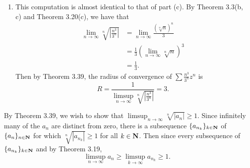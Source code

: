 \begin{ex}
\begin{enumerate}
\item This computation is almost identical to that of part (c). By Theorem 3.3(b, c) and Theorem 3.20(c), we have that
\begin{align*}
\lim_{n\to\infty}\sqrt[n]{\left|\frac{n^3}{3^n}\right|} & = \lim_{n\to\infty}\frac{(\sqrt[n]{n})^n}{3}\\
& = \frac{1}{3}\left(\lim_{n\to\infty}\sqrt[n]{n}\right)^3\\
& = \frac{1}{3}.
\end{align*}
Then by Theorem 3.39, the radius of convergence of $\sum\frac{n^3}{3^n}z^n$ is \[R = \frac{1}{\limsup_{n\to\infty}\sqrt[n]{\left|\frac{n^3}{3^n}\right|}} = 3.\]
\end{enumerate}
\end{ex}

\begin{ex}
By Theorem 3.39, we wish to show that $\limsup_{n\to\infty}\sqrt[n]{|a_n|} \geq 1$. Since infinitely many of the $a_n$ are distinct from zero, there is a subsequence $\{a_{n_k}\}_{k \in \mathbf{N}}$ of $\{a_n\}_{n \in \mathbf{N}}$ for which $\sqrt[n]{|a_{n_k}|} \geq 1$ for all $k \in \mathbf{N}$. Then since every subsequence of $\{a_{n_k}\}_{k\in\mathbf{N}}$ and by Theorem 3.19, \[\limsup_{n\to\infty}a_n \geq \limsup_{k\to\infty}a_{n_k} \geq 1.\]
\end{ex}

